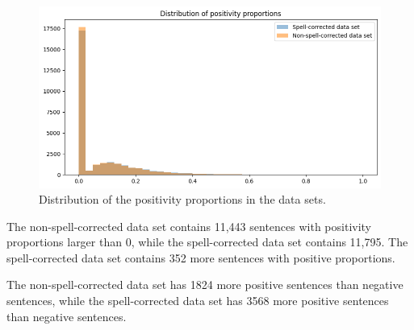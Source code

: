 \begin{figure}[H]
    \centering
    \includegraphics[width=1\textwidth]{resources/positivity_distributions.png}
    \caption{Distribution of the positivity proportions in the data sets.}
    \label{fig:positivity_distribution}
\end{figure}

The non-spell-corrected data set contains 11,443 sentences with positivity proportions larger than 0, while the spell-corrected data set contains 11,795. The spell-corrected data set contains 352 more sentences with positive proportions.

The non-spell-corrected data set has 1824 more positive sentences than negative sentences, while the spell-corrected data set has 3568 more positive sentences than negative sentences.

